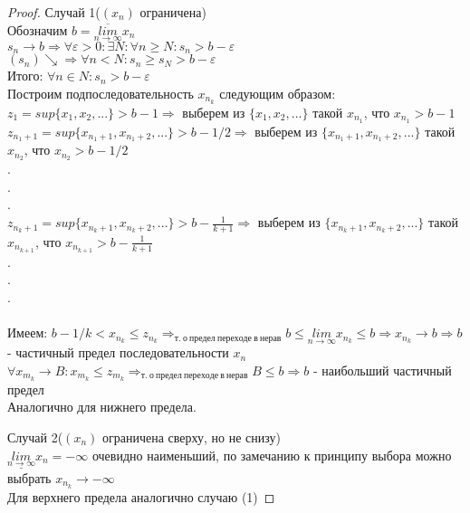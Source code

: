 \documentclass[11pt,a4paper,titlepage]{article}
\renewcommand{\lim}[2]{\underset{#1 \rightarrow #2}{lim}}
\newcommand{\limn}{\lim{n}{\infty}}
\renewcommand{\implies}{\Rightarrow}
\renewcommand{\epsilon}{\varepsilon}
\newcommand{\limsupn}{\overline{\limn}}
\newcommand{\liminfn}{\underline{\limn}}
\begin{document}
    \begin{proof}
        \item{Случай 1}($(x_n)$ ограничена)\\
        Обозначим $b = \limsupn x_n$\\
        $s_n \to b \implies \forall \epsilon > 0: \exists N: \forall n \geq N: s_n > b - \epsilon$\\
        $(s_n)\searrow \implies \forall n < N: s_n \geq s_N > b - \epsilon$\\
        Итого: $\forall n \in N: s_n > b - \epsilon$\\
        Построим подпоследовательность $x_{n_k}$ следующим образом:\\
        $z_1 = sup\{x_1, x_2, ...\} > b - 1 \implies$ выберем из $\{x_1, x_2, ...\}$ такой $x_{n_1}$, что $x_{n_1} > b - 1$\\
        $z_{n_1+1} = sup\{x_{n_1+1}, x_{n_1+2}, ...\} > b - 1/2 \implies$ выберем из $\{x_{n_1+1}, x_{n_1+2}, ...\}$ такой $x_{n_2}$, что $x_{n_2} > b - 1/2$\\
        .\\
        .\\
        .\\
        $z_{n_k+1} = sup\{x_{n_k+1}, x_{n_k+2}, ...\} > b - \frac{1}{k+1} \implies$ выберем из $\{x_{n_k+1}, x_{n_k+2}, ...\}$ такой $x_{n_{k+1}}$, что $x_{n_{k+1}} > b - \frac{1}{k+1}$\\
        .\\
        .\\
        .\\
        \bigskip\\

        Имеем: $b - 1/k < x_{n_k} \leq z_{n_k} \implies_{т.\ о\ предел\ переходе\ в\ нерав} b \leq \limn x_{n_k} \leq b \implies x_{n_k} \to b \implies b $ - частичный предел последовательности $x_n$\\
        $\forall x_{m_k} \to B: x_{m_k} \leq z_{m_k} \implies_{т.\ о\ предел\ переходе\ в\ нерав} B \leq b \implies b$ - наибольший частичный предел\\
        Аналогично для нижнего предела.\\

        \item{Случай 2}($(x_n)$ ограничена сверху, но не снизу)\\
        $\liminfn x_n = -\infty$ очевидно наименьший, по замечанию к принципу выбора можно выбрать $x_{n_k} \to -\infty$\\
        Для верхнего предела аналогично случаю (1)


\end{proof}
\end{document}
